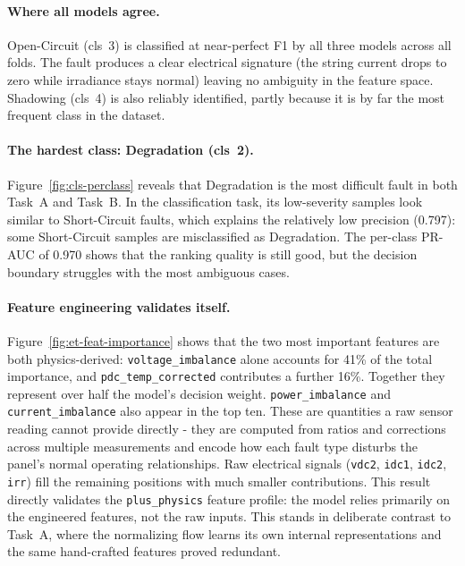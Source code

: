 \paragraph{Where all models agree.}
Open-Circuit (cls~3) is classified at near-perfect F1 by all three models across all folds. The fault produces a clear electrical signature (the string current drops to zero while irradiance stays normal) leaving no ambiguity in the feature space. Shadowing (cls~4) is also reliably identified, partly because it is by far the most frequent class in the dataset.

\paragraph{The hardest class: Degradation (cls~2).}
Figure~\ref{fig:cls-perclass} reveals that Degradation is the most difficult fault in both Task~A and Task~B. In the classification task, its low-severity samples look similar to Short-Circuit faults, which explains the relatively low precision (0.797): some Short-Circuit samples are misclassified as Degradation. The per-class PR-AUC of 0.970 shows that the ranking quality is still good, but the decision boundary struggles with the most ambiguous cases.

\paragraph{Feature engineering validates itself.}
Figure~\ref{fig:et-feat-importance} shows that the two most important features are both physics-derived: \texttt{voltage\_imbalance} alone accounts for 41\% of the total importance, and \texttt{pdc\_temp\_corrected} contributes a further 16\%. Together they represent over half the model's decision weight. \texttt{power\_imbalance} and \texttt{current\_imbalance} also appear in the top ten. These are quantities a raw sensor reading cannot provide directly - they are computed from ratios and corrections across multiple measurements and encode how each fault type disturbs the panel's normal operating relationships. Raw electrical signals (\texttt{vdc2}, \texttt{idc1}, \texttt{idc2}, \texttt{irr}) fill the remaining positions with much smaller contributions. This result directly validates the \texttt{plus\_physics} feature profile: the model relies primarily on the engineered features, not the raw inputs. This stands in deliberate contrast to Task~A, where the normalizing flow learns its own internal representations and the same hand-crafted features proved redundant.

